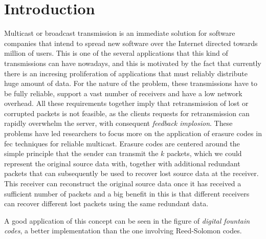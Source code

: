 \section{Introduction}
Multicast or broadcast transmission is an immediate solution for software companies that intend to spread new software over the Internet directed towards million of users. This is one of the several applications that this kind of transmissions can have nowadays, and this is motivated by the fact that currently there is an incresing proliferation of applications that must reliably distribute huge amount of data. For the nature of the problem, these transmissions have to be fully reliable, support a vast number of receivers and have a low network overhead. All these requirements together imply that retransmission of lost or corrupted packets is not feasible, as the clients requests for retransmission can rapidly overwhelm the server, with consequent \textit{feedback implosion}. \cite{Byers} These problems have led researchers to focus more on the application of erasure codes in \gls{fec} techniques for reliable multicast. Erasure codes are centered around the simple principle that the sender can transmit the $k$ packets, which we could represent the original source data with, together with additional redundant packets that can subsequently be used to recover lost source data at the receiver. This receiver can reconstruct the original source data once it has received a sufficient number of packets and a big benefit in this is that different receivers can recover different lost packets using the same redundant data.

A good application of this concept can be seen in the figure of \textit{digital fountain codes}, a better implementation than the one involving Reed-Solomon codes.\cite{Byers}
